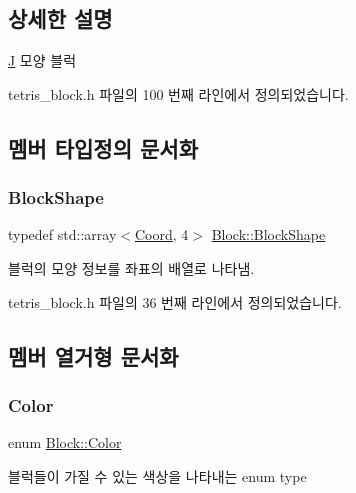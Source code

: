 \subsection{상세한 설명}
\mbox{\hyperlink{class_j}{J}} 모양 블럭 

tetris\+\_\+block.\+h 파일의 100 번째 라인에서 정의되었습니다.



\subsection{멤버 타입정의 문서화}
\mbox{\label{class_block_aca5d951639f113e2ebd7856209d6b9ab}} 
\subsubsection{\texorpdfstring{Block\+Shape}{BlockShape}}
{\footnotesize\ttfamily typedef std\+::array$<$\mbox{\hyperlink{struct_coord}{Coord}}, 4$>$ \mbox{\hyperlink{class_block_aca5d951639f113e2ebd7856209d6b9ab}{Block\+::\+Block\+Shape}}\hspace{0.3cm}{\ttfamily [inherited]}}



블럭의 모양 정보를 좌표의 배열로 나타냄. 



tetris\+\_\+block.\+h 파일의 36 번째 라인에서 정의되었습니다.



\subsection{멤버 열거형 문서화}
\mbox{\label{class_block_ad054b4ac51df79aa910040b2a2fdf7b5}} 
\subsubsection{\texorpdfstring{Color}{Color}}
{\footnotesize\ttfamily enum \mbox{\hyperlink{class_block_ad054b4ac51df79aa910040b2a2fdf7b5}{Block\+::\+Color}}\hspace{0.3cm}{\ttfamily [inherited]}}



블럭들이 가질 수 있는 색상을 나타내는 enum type 

